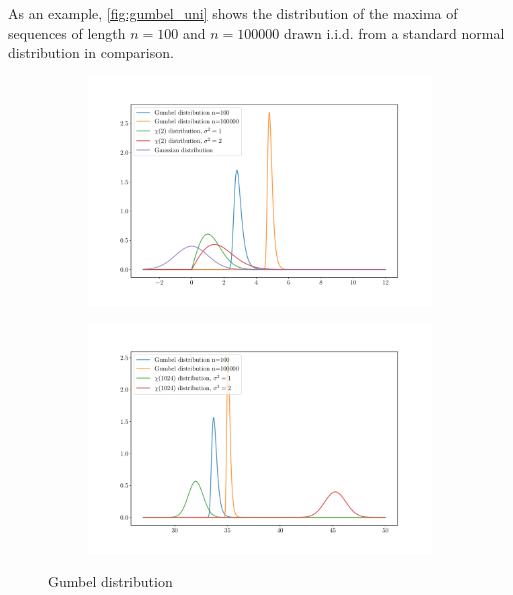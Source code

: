 As an example, \autoref{fig:gumbel_uni} shows the distribution of the maxima of
sequences of length $n = 100$ and $n = 100000$ drawn i.i.d. from a standard
normal distribution in comparison.
\begin{figure}[htpb]
    \centering

    \begin{subfigure}[]{0.48\textwidth}
        \centering
    \includegraphics[width=\linewidth]{figures/gumbel_multi_2.pdf}
    \caption{}
    \label{fig:}
    \end{subfigure}
    \begin{subfigure}[]{0.48\textwidth}
        \centering
    \includegraphics[width=\linewidth]{figures/gumbel_multi_1024.pdf}
    \caption{}
    \label{fig:}
    \end{subfigure}

    \caption{Gumbel distribution}%
    \label{fig:gumbel_multi}
\end{figure}

